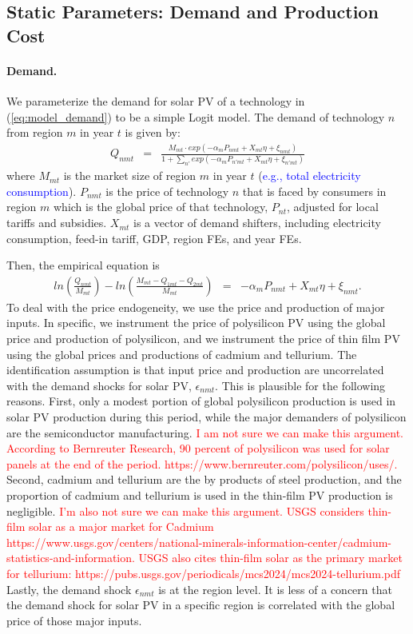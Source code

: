 \documentclass[12pt]{article}
\begin{document}
\subsection{Static Parameters: Demand and Production Cost}
\label{subsec:est_static}

\paragraph{Demand.} We parameterize the demand for solar PV of a technology in (\ref{eq:model_demand}) to be a simple Logit model. The demand of technology $n$ from region $m$ in year $t$ is given by:
\begin{eqnarray*}
Q_{nmt} & = & \frac{M_{mt}\cdot exp(-\alpha_{m} P_{nmt} + X_{mt}\eta +\xi_{nmt})}{1+\sum_{n'}exp(-\alpha_{m} P_{n'mt} + X_{mt}\eta +\xi_{n'mt})}  %
\end{eqnarray*}
where $M_{mt}$ is the market size of region $m$ in year $t$ (\textcolor{blue}{e.g., total electricity consumption}). $P_{nmt}$ is the price of technology $n$ that is faced by consumers in region $m$ which is the global price of that technology, $P_{nt}$, adjusted for local tariffs and subsidies. $X_{mt}$ is a vector of demand shifters, including electricity consumption, feed-in tariff, GDP, region FEs, and year FEs. 

Then, the empirical equation is
\begin{eqnarray}
ln( \frac{Q_{nmt}}{M_{mt}} ) - ln( \frac{M_{mt}- Q_{1mt}- Q_{2mt}}{M_{mt}} ) & = &  -\alpha_{m} P_{nmt} + X_{mt}\eta +\xi_{nmt}. \label{eq:demand_specification}
\end{eqnarray}
To deal with the price endogeneity, we use the price and production of major inputs. In specific, we instrument the price of polysilicon PV using the global price and production of polysilicon, and we instrument the price of thin film PV using the global prices and productions of cadmium and tellurium. The identification assumption is that input price and production are uncorrelated with the demand shocks for solar PV, $\epsilon_{nmt}$.  This is plausible for the following reasons. First, only a modest portion of global polysilicon production is used in solar PV production during this period, while the major demanders of polysilicon are the semiconductor manufacturing. \textcolor{red}{I am not sure we can make this argument. According to Bernreuter Research, 90 percent of polysilicon was used for solar panels at the end of the period. https://www.bernreuter.com/polysilicon/uses/.} Second, cadmium and tellurium are the by products of steel production, and the proportion of cadmium and tellurium is used in the thin-film PV production is negligible. \textcolor{red}{I'm also not sure we can make this argument. USGS considers thin-film solar as a major market for Cadmium https://www.usgs.gov/centers/national-minerals-information-center/cadmium-statistics-and-information. USGS also cites thin-film solar as the primary market for tellurium: https://pubs.usgs.gov/periodicals/mcs2024/mcs2024-tellurium.pdf} Lastly, the demand shock $\epsilon_{nmt}$ is at the region level. It is less of a concern that the demand shock for solar PV in a specific region is correlated with the global price of those major inputs.
\end{document}
